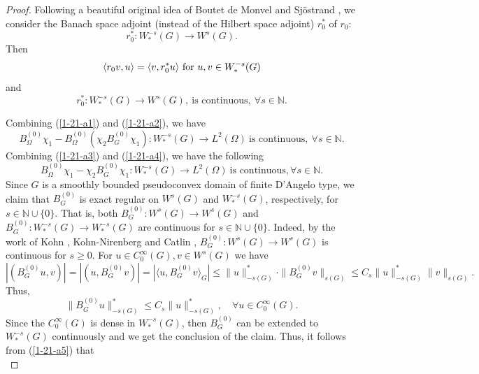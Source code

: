 \documentclass[a4paper,centertags,oneside,12pt]{amsart}
\numberwithin{equation}{section}
\begin{document}
\begin{proof}
Following a beautiful original idea of Boutet de Monvel and Sjöstrand \cite{BS76}, we consider the Banach space adjoint (instead of  the Hilbert space adjoint)  $r_0^\ast$ of $r_0$:
 $$r_0^\ast: W_\ast^{-s}(G)\rightarrow W^s(G).$$ 
 Then
$$\langle r_0v, u\rangle =\langle v, r_0^\ast u\rangle
\hbox{   for } u, v\in W_\ast^{-s}(G)$$
and
\begin{equation}\label{1-24-a1}
    r_0^\ast: W_\ast^{-s}(G)\rightarrow W^s(G),~ \text{is continuous}, ~\forall s\in\mathbb N.
\end{equation}

Combining (\ref{1-21-a1}) and (\ref{1-21-a2}), we have 
    \begin{equation}\label{1-21-a4}
        B_\Omega^{(0)}\chi_1-B_\Omega^{(0)}(\chi_2 B_G^{(0)}\chi_1): W_\ast^{-s}(G)\rightarrow L^2(\Omega)~\text{is continuous},~\forall s\in\mathbb N.
    \end{equation}
Combining (\ref{1-21-a3}) and (\ref{1-21-a4}), we have the following
\begin{equation}\label{1-21-a5}
    B_\Omega^{(0)}\chi_1-\chi_2 B_G^{(0)}\chi_1: W_\ast^{-s}(G)\rightarrow L^2(\Omega) ~\text{is continuous}, \forall s\in\mathbb N.
\end{equation}
Since $G$ is a smoothly bounded pseudoconvex domain of finite D'Angelo type, we claim that $B_G^{(0)}$ is exact regular on $W^s(G)$ and $W^{-s}_\ast(G)$, respectively, for $s\in\mathbb N\cup\{0\}$. That is, both $B_G^{(0)}: W^s(G)\rightarrow W^s(G)$ and $B_G^{(0)}: W^{-s}_\ast(G)\rightarrow W^{-s}_\ast(G)$ are continuous for $s\in\mathbb N\cup\{0\}$. Indeed, by the work of Kohn \cite{Ko64, Ko63}, Kohn-Nirenberg \cite{KN65} and Catlin \cite{Ca87},
$B_G^{(0)}: W^s(G)\rightarrow W^s(G)$
is continuous for $s\geq 0$. For $u\in C_0^\infty(G), v\in W^s(G)$ we have
\begin{equation*}
    |(B_G^{(0)} u, v)|=|(u, B_G^{(0)}v)|=|\langle u, B_G^{(0)}v\rangle_G|\leq \|u\|_{-s(G)}^\ast\cdot\|B_G^{(0)}v\|_{s(G)}\leq C_s\|u\|_{-s(G)}^\ast \|v\|_{s(G)}.
\end{equation*}
Thus,
\begin{equation*}
    \|B_G^{(0)}u\|_{-s(G)}^\ast\leq C_s\|u\|_{-s(G)}^\ast, \quad\forall u\in C_0^\infty(G).
\end{equation*}
Since the $C_0^\infty(G)$ is dense in $W_{\ast}^{-s}(G)$, then $B_G^{(0)}$ can be extended to $W^{-s}_\ast(G)$ continuously and  we get the conclusion of the claim.
Thus, it follows from (\ref{1-21-a5}) that 
\begin{equation}\label{1-21-b5}

\end{equation}
\end{proof}
\end{document}

